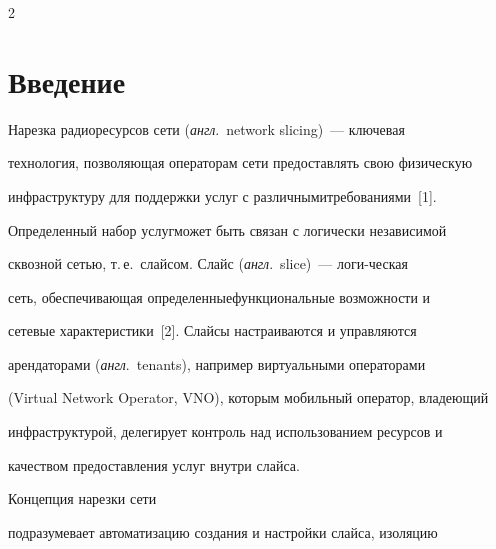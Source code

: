 




\thispagestyle{headings}





\begin{multicols}{2}





\label{st\stat}





\section{Введение}





  Нарезка радиоресурсов сети (\textit{англ}.\ network slicing)~--- ключевая 


технология, позволяющая операторам сети предоставлять свою физическую 


инфраструктуру для поддержки услуг с различными\linebreak требованиями~[1]. 


Определенный набор услуг\linebreak может быть связан с логически независимой 


сквоз\-ной сетью, т.\,е.\ слайсом. Слайс (\textit{англ}.\ slice)~--- логи-\linebreak ческая 


сеть, обеспечивающая определенные\linebreak функциональные возможности и 


сетевые харак\-те\-ри\-сти\-ки~[2]. Слайсы настраиваются и управ\-ля\-ют\-ся 


арендаторами (\textit{англ}.\ tenants), например виртуальными операторами 


(Virtual Network Operator, VNO), которым мобильный оператор, владеющий 


инфраструктурой, делегирует контроль над использованием ресурсов и 


качеством предоставления услуг внутри слайса. 





Концепция нарезки сети 


подразумевает автоматизацию создания и настройки слайса, изоляцию 



\end{multicols}
